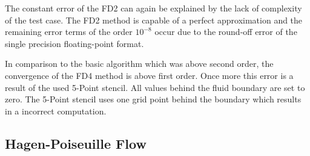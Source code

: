 The constant error of the FD2 can again be explained by the lack of complexity of the test case.
The FD2 method is capable of a perfect approximation and
the remaining error terms of the order $10^{-8}$
occur due to the round-off error of the single precision floating-point format.

In comparison to the basic algorithm which was above second order, the convergence of the FD4 method is above first order.
Once more this error is a result of the used 5-Point stencil.  All values behind the fluid boundary are set
to zero. The 5-Point stencil uses one grid point behind the boundary which results in a incorrect computation.

\subsection{Hagen-Poiseuille Flow}

\label{sec:hpflow_discussion}


